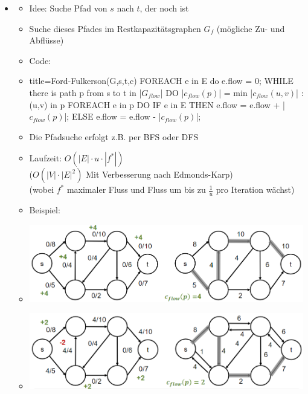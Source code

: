 \documentclass[
    12pt,
    a4paper,
    ngerman,
    color=3b,%
    marginpar=false,
    colorback=false,
    leqno,
]{tudaexercise}
\begin{document}
\begin{itemize}
        \item {}
            \begin{itemize}
                \item Idee: Suche Pfad von $s$ nach $t$, der noch  ist
                \item Suche dieses Pfades im Restkapazitätsgraphen $G_f$ (mögliche Zu- und Abflüsse)
                \item Code:
                \item[]
                    \begin{ccode}[autogobble,escapeinside=||]{title={Ford-Fulkerson(G,s,t,c)}}
                    FOREACH e in E do e.flow = 0;
                    WHILE there is path p from s to t in |$G_{flow}$| DO
                        |$c_{flow}(p)$| = min {|$c_{flow}(u,v)$| : (u,v) in p}
                        FOREACH e in p DO
                            IF e in E THEN
                                e.flow = e.flow + |$c_{flow}(p)$|;
                            ELSE
                                e.flow = e.flow - |$c_{flow}(p)$|;
                    \end{ccode}
                \item Die Pfadsuche erfolgt z.B. per BFS oder DFS
                \item Laufzeit: $O(|E| \cdot u \cdot |f^*|)$ \\
                        ($O(|V| \cdot |E|^2)$ Mit Verbesserung nach Edmonds-Karp) \\
                        (wobei $f^*$ maximaler Fluss und Fluss um bis zu $\frac{1}{u}$ pro Iteration wächst)
\pagebreak
                \item Beispiel:
                \item[] \includegraphics[width=12cm]{pictures/fordbsp1.PNG}
                \item[] \includegraphics[width=12cm]{pictures/fordbsp2.PNG}
            \end{itemize}
    \end{itemize}
\clearpage
\end{document}
